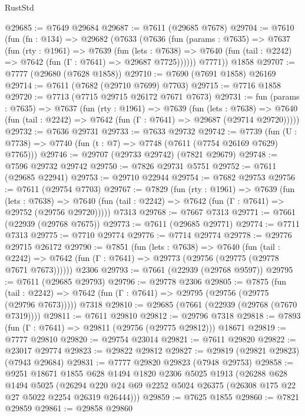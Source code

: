 \begin{lexlean}{RustStd}
\begin{coremodule}
@29685 := @7649 @29684
@29687 := @7611 (@29685 @7678)
@29704 := @7610
    (fun (fn : @134) =>
    @29682
      (@7633
        (@7636
          (fun (params : @7635) =>
          @7637
            (fun (rty : @1961) =>
            @7639
              (fun (lets : @7638) =>
              @7640 (fun (tail : @2242) => @7642 (fun (Γ : @7641) => @29687 @7725))))))
        @7771))
    @1858
@29707 := @7777 (@29680 (@7628 @1858))
@29710 := @7690 (@7691 @1858) @26169
@29714 := @7611 (@7682 (@29710 @7699) @7703)
@29715 := @7716 @1858
@29720 := @7713 (@7715 @29715 @26172 @7671 @7673)
@29731 := fun (params : @7635) =>
  @7637
    (fun (rty : @1961) =>
    @7639
      (fun (lets : @7638) =>
      @7640 (fun (tail : @2242) => @7642 (fun (Γ : @7641) => @29687 (@29714 @29720)))))
@29732 := @7636 @29731
@29733 := @7633 @29732
@29742 := @7739
    (fun (U : @7738) => @7740 (fun (t : @7) => @7748 (@7611 (@7754 @26169 @7629) @7765)))
@29746 := @29707 (@29733 @29742) (@7821 @29679)
@29748 := @7596 @29732 @29742
@29750 := @7826 @29731 @5751
@29752 := @7611 (@29685 @22941)
@29753 := @29710 @22944
@29754 := @7682 @29753
@29756 := @7611 (@29754 @7703)
@29767 := @7829
    (fun (rty : @1961) =>
    @7639
      (fun (lets : @7638) =>
      @7640 (fun (tail : @2242) => @7642 (fun (Γ : @7641) => @29752 (@29756 @29720)))))
    @7313
@29768 := @7667 @7313
@29771 := @7661 (@22939 (@29768 @7675))
@29773 := @7611 (@29685 @29771)
@29774 := @7711 @7313
@29775 := @7710 @29774
@29776 := @7714 @29774
@29778 := @29776 @29715 @26172
@29790 := @7851
    (fun (lets : @7638) =>
    @7640
      (fun (tail : @2242) =>
      @7642 (fun (Γ : @7641) => @29773 (@29756 (@29775 (@29778 @7671 @7673))))))
    @2306
@29793 := @7661 (@22939 (@29768 @9597))
@29795 := @7611 (@29685 @29793)
@29796 := @29778 @2306
@29805 := @7875
    (fun (tail : @2242) => @7642 (fun (Γ : @7641) => @29795 (@29756 (@29775 (@29796 @7673)))))
    @7318
@29810 := @29685 (@7661 (@22939 (@29768 (@7670 @7319))))
@29811 := @7611 @29810
@29812 := @29796 @7318
@29818 := @7893 (fun (Γ : @7641) => @29811 (@29756 (@29775 @29812))) @18671
@29819 := @7777 @29810
@29820 := @29754 @23014
@29821 := @7611 @29820
@29822 := @23017 @29774
@29823 := @29822 @29812
@29827 := @29819 (@29821 @29823) (@7943 @29684)
@29831 := @7777 @29820 @29823 (@7948 @29753)
@29858 := @9251
    @18671
    @1855
    @628
    @1494
    @1820
    @2306
    @5025
    @1913
    (@26288
      @628
      @1494
      @5025
      (@26294 @220 @24 @69 @2252 @5024 @26375 (@26308 @175 @22 @27 @5022 @2254 @26319 @26444)))
@29859 := @7625 @1855
@29860 := @7821 @29859
@29861 := @29858 @29860

\end{coremodule}
\end{lexlean}
